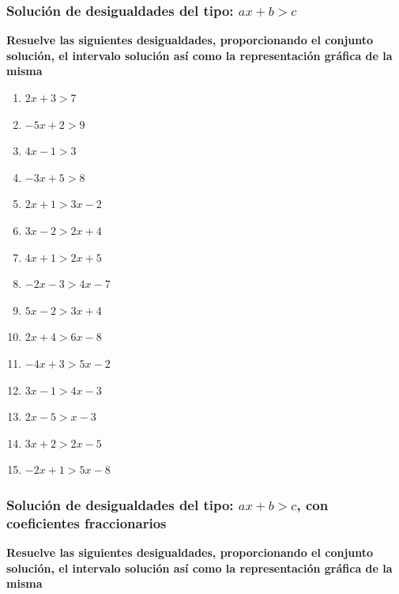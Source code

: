 \documentclass[12pt]{article}
\begin{document}
\subsubsection{Solución de desigualdades del tipo: \(ax+b>c\)}

\textbf{Resuelve las siguientes desigualdades, proporcionando el conjunto solución, el intervalo solución así como la representación gráfica de la misma}

\begin{enumerate}
\def\labelenumi{\arabic{enumi}.}
\item
  \(2x+3>7\)
\item
  \(-5x+2>9\)
\item
  \(4x-1>3\)
\item
  \(-3x+5>8\)
\item
  \(2x+1>3x-2\)
\item
  \(3x-2>2x+4\)
\item
  \(4x+1>2x+5\)
\item
  \(-2x-3>4x-7\)
\item
  \(5x-2>3x+4\)
\item
  \(2x+4>6x-8\)
\item
  \(-4x+3>5x-2\)
\item
  \(3x-1>4x-3\)
\item
  \(2x-5>x-3\)
\item
  \(3x+2>2x-5\)
\item
  \(-2x+1>5x-8\)
\end{enumerate}

\subsubsection{Solución de desigualdades del tipo: \(ax+b>c\), con coeficientes fraccionarios}

\textbf{Resuelve las siguientes desigualdades, proporcionando el conjunto solución, el intervalo solución así como la representación gráfica de la misma}
\end{document}
